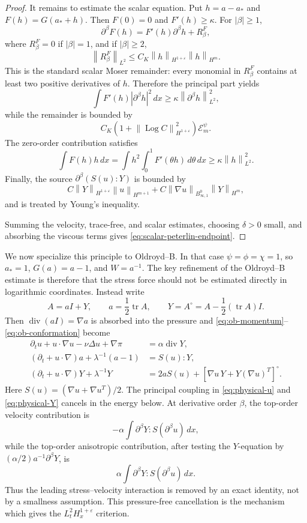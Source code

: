 \documentclass[11pt]{article}
\newcommand{\tr}{\operatorname{tr}}
\newcommand{\divv}{\operatorname{div}}
\newcommand{\Log}{\operatorname{Log}}
\newcommand{\calE}{\mathcal E}
\newcommand{\eps}{\varepsilon}
\newcommand{\norm}[1]{\left\lVert #1\right\rVert}
\newcommand{\Besov}{B^0_{\infty,1}}
\begin{document}
\begin{proof}
It remains to estimate the scalar equation.  Put \(h=a-a_*\) and
\(F(h)=G(a_*+h)\).  Then \(F(0)=0\) and \(F'(h)\ge\kappa\).  For \(|\beta|\ge1\),
\[
  \partial^\beta F(h)=F'(h)\partial^\beta h+R_\beta^F,
\]
where \(R_\beta^F=0\) if \(|\beta|=1\), and if \(|\beta|\ge2\),
\[
  \norm{R_\beta^F}_{L^2}
  \le C_K\norm{h}_{H^{1+\eps}}\norm{h}_{H^m}.
\]
This is the standard scalar Moser remainder: every monomial in \(R_\beta^F\)
contains at least two positive derivatives of \(h\).  Therefore the principal
part yields
\[
  \int F'(h)|\partial^\beta h|^2\,dx\ge\kappa\norm{\partial^\beta h}_{L^2}^2,
\]
while the remainder is bounded by
\[
  C_K(1+\norm{\Log C}_{H^{1+\eps}}^2)\calE_m^\psi .
\]
The zero-order contribution satisfies
\[
  \int F(h)h\,dx
  =\int h^2\int_0^1F'(\theta h)\,d\theta\,dx
  \ge \kappa\norm{h}_{L^2}^2.
\]
Finally, the source \(\partial^\beta(S(u):Y)\) is bounded by
\[
  C\norm{Y}_{H^{1+\eps}}\norm{u}_{H^{m+1}}
  +C\norm{\nabla u}_{\Besov}\norm{Y}_{H^m},
\]
and is treated by Young's inequality.

Summing the velocity, trace-free, and scalar estimates, choosing \(\delta>0\)
small, and absorbing the viscous terms gives
\eqref{eq:scalar-peterlin-endpoint}.
\end{proof}

We now specialize this principle to Oldroyd--B.  In that case
\(\psi=\phi=\chi=1\), so \(a_*=1\), \(G(a)=a-1\), and \(W=a^{-1}\).
The key refinement of the Oldroyd--B estimate is therefore that the stress
force should not be estimated directly in logarithmic coordinates.  Instead write
\[
  A=aI+Y,\qquad a=\frac12\tr A,
  \qquad Y=A^\circ=A-\frac12(\tr A)I .
\]
Then \(\divv(aI)=\nabla a\) is absorbed into the pressure and
\eqref{eq:ob-momentum}--\eqref{eq:ob-conformation} become
\begin{align}
  \partial_tu+u\cdot\nabla u-\nu\Delta u+\nabla\pi
    &=\alpha\divv Y, \label{eq:physical-u}\\
  (\partial_t+u\cdot\nabla)a+\lambda^{-1}(a-1)&=S(u):Y,
    \label{eq:physical-a}\\
  (\partial_t+u\cdot\nabla)Y+\lambda^{-1}Y
    &=2aS(u)+[\nabla u\,Y+Y(\nabla u)^T]^\circ .
    \label{eq:physical-Y}
\end{align}
Here \(S(u)=(\nabla u+\nabla u^T)/2\).  The principal coupling in
\eqref{eq:physical-u} and \eqref{eq:physical-Y} cancels in the energy below.
At derivative order \(\beta\), the top-order velocity contribution is
\[
  -\alpha\int \partial^\beta Y:S(\partial^\beta u)\,dx,
\]
while the top-order anisotropic contribution, after testing the \(Y\)-equation
by \((\alpha/2)a^{-1}\partial^\beta Y\), is
\[
  \alpha\int \partial^\beta Y:S(\partial^\beta u)\,dx.
\]
Thus the leading stress--velocity interaction is removed by an exact identity,
not by a smallness assumption.  This pressure-free cancellation is the
mechanism which gives the \(L^2_tH^{1+\eps}_x\) criterion.
\end{document}
